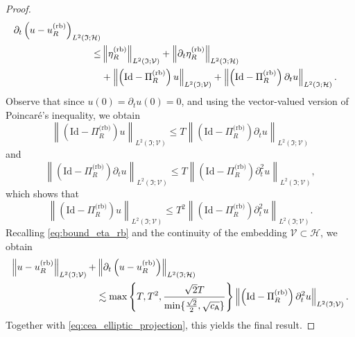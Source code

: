 \documentclass[10pt,a4paper]{amsart}
\newcommand{\norm}[1]{\left \lVert #1 \right \rVert}
\begin{document}
\begin{proof}
\begin{equation}
\begin{aligned}
{		\partial_t 
		\left(u
		-
		 u^{\normalfont\text{(rb)}}_R
		 \right)
	}_{L^2(\mathfrak{I};\mathcal{H})}
	\\
    \leq
    &
	\norm{
		\eta^{\text{(rb)}}_R
	}_{L^2(\mathfrak{I};\mathcal{V})}
    +
    \norm{	
        \partial_t
        \eta^{\text{(rb)}}_R
    }_{L^2(\mathfrak{I};\mathcal{H})}
    \\
    &
    +
    \norm{
        \left(
            \text{Id}
            -
             \Pi^{\text{(rb)}}_R
        \right)  u
    }_{L^2(\mathfrak{I};\mathcal{V})}
    +
    \norm{
        \left(
            \text{Id}
            -
             \Pi^{\text{(rb)}}_R
        \right)  \partial_t u
    }_{L^2(\mathfrak{I};\mathcal{H})}.
\end{aligned}
\end{equation}
Observe that since $u(0) = \partial_t u(0) = 0$, and using the vector-valued version of
Poincaré's inequality, we obtain
\begin{equation}
    \norm{
    \left(
        \text{Id}
        -
         \Pi^{\text{(rb)}}_R
    \right)
    u}_{L^2(\mathfrak{I};\mathcal{V})}
    \leq
    T
    \norm{
    \left(
        \text{Id}
        -
        \Pi^{\text{(rb)}}_R
    \right)
    \partial_t u}_{L^2(\mathfrak{I};\mathcal{V})}
\end{equation}
and
\begin{equation}
    \norm{
        \left(
            \text{Id}
            -
             \Pi^{\text{(rb)}}_R
        \right)
        \partial_t u
    }_{L^2(\mathfrak{I};\mathcal{V})}
    \leq
    T
    \norm{
    \left(
        \text{Id}
        -
         \Pi^{\text{(rb)}}_R
    \right)
    \partial^2_t u}_{L^2(\mathfrak{I};\mathcal{V})},
\end{equation}
which shows that
\begin{equation}
    \norm{
        \left(
            \text{Id}
            -
            \Pi^{\text{(rb)}}_R
        \right)
        u
    }_{L^2(\mathfrak{I};\mathcal{V})}
    \leq
    T^2
    \norm{
    \left(
        \text{Id}
        -
         \Pi^{\text{(rb)}}_R
    \right)
    \partial^2_t u}_{L^2(\mathfrak{I};\mathcal{V})}.
\end{equation}
Recalling \eqref{eq:bound_eta_rb} and the continuity of the embedding
$\mathcal{V} \subset \mathcal{H}$, we obtain
\begin{equation}
\begin{aligned}
	\norm{
		u
		-
		u^{\normalfont\text{(rb)}}_R
	}_{L^2(\mathfrak{I};\mathcal{V})}
    +
    &
	\norm{
		\partial_t 
		\left(u
		-
		 u^{\normalfont\text{(rb)}}_R
		 \right)
	}_{L^2(\mathfrak{I};\mathcal{H})}
	\\
	&
    \lesssim
    \max
    \left\{
        T,T^2,\frac{\sqrt{2}T}{\min\{\frac{\sqrt{2}}{2} ,\sqrt{ c_{\mathsf{A}}}\}}
    \right\}
    \norm{
        \left(
            \text{Id}
            -
        		\Pi^{\text{(rb)}}_R
        \right) \partial^2_t u
    }_{L^2(\mathfrak{I};\mathcal{V})}.
\end{aligned}
\end{equation}
Together with \eqref{eq:cea_elliptic_projection}, this yields the final result. 
\end{proof}
\end{document}
